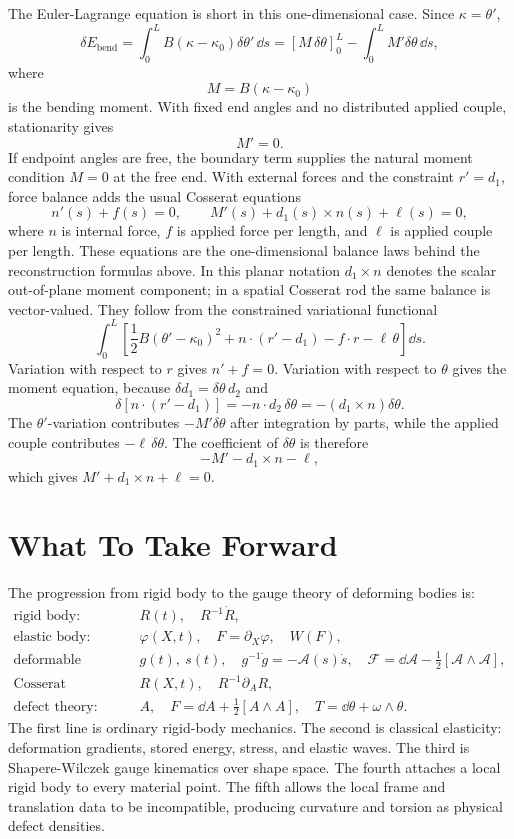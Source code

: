 The Euler-Lagrange equation is short in this one-dimensional case. Since
\(\kappa=\theta'\),
\[
  \delta E_{\mathrm{bend}}
  =
  \int_0^L B(\kappa-\kappa_0)\delta\theta'\,\dd s
  =
  \left[M\,\delta\theta\right]_0^L
  -
  \int_0^L M'\delta\theta\,\dd s,
\]
where
\[
  M=B(\kappa-\kappa_0)
\]
is the bending moment. With fixed end angles and no distributed applied couple,
stationarity gives
\[
  M'=0.
\]
If endpoint angles are free, the boundary term supplies the natural moment
condition \(M=0\) at the free end. With external forces and the constraint
\(r'=d_1\), force balance adds the usual Cosserat equations
\[
  n'(s)+f(s)=0,\qquad M'(s)+d_1(s)\times n(s)+\ell(s)=0,
\]
where \(n\) is internal force, \(f\) is applied force per length, and
\(\ell\) is applied couple per length. These equations are the one-dimensional
balance laws behind the reconstruction formulas above.
In this planar notation \(d_1\times n\) denotes the scalar out-of-plane moment
component; in a spatial Cosserat rod the same balance is vector-valued.
They follow from the constrained variational functional
\[
  \int_0^L
  \left[
    \frac12B(\theta'-\kappa_0)^2
    +n\cdot(r'-d_1)
    -f\cdot r-\ell\,\theta
  \right]\dd s.
\]
Variation with respect to \(r\) gives \(n'+f=0\). Variation with respect to
\(\theta\) gives the moment equation, because
\(\delta d_1=\delta\theta\,d_2\) and
\[
  \delta\!\left[n\cdot(r'-d_1)\right]
  =
  -n\cdot d_2\,\delta\theta
  =
  -(d_1\times n)\delta\theta .
\]
The \(\theta'\)-variation contributes \(-M'\delta\theta\) after integration by
parts, while the applied couple contributes \(-\ell\,\delta\theta\). The
coefficient of \(\delta\theta\) is therefore
\[
  -M'-d_1\times n-\ell,
\]
which gives \(M'+d_1\times n+\ell=0\).

\section{What To Take Forward}
\label{sec:deforming-body-take-forward}

The progression from rigid body to the gauge theory of deforming bodies is:
\[
\begin{aligned}
  \text{rigid body:}&\quad R(t),\quad R^{-1}\dot R,\\
  \text{elastic body:}&\quad \varphi(X,t),\quad F=\partial_X\varphi,\quad W(F),\\
  \text{deformable body:}&\quad g(t),\ s(t),\quad
  g^{-1}\dot g=-\mathcal A(s)\dot s,\quad
  \mathcal F=\dd\mathcal A-\frac12[\mathcal A\wedge\mathcal A],\\
  \text{Cosserat continuum:}&\quad R(X,t),\quad R^{-1}\partial_A R,\\
  \text{defect theory:}&\quad A,\quad F=\dd A+\frac12[A\wedge A],\quad
  T=\dd\theta+\omega\wedge\theta.
\end{aligned}
\]
The first line is ordinary rigid-body mechanics. The second is
classical elasticity: deformation gradients, stored energy, stress, and elastic
waves. The third is Shapere-Wilczek gauge kinematics over shape space. The
fourth attaches a local rigid body to every material point. The fifth allows
the local frame and
translation data to be incompatible, producing curvature and torsion as physical
defect densities.

